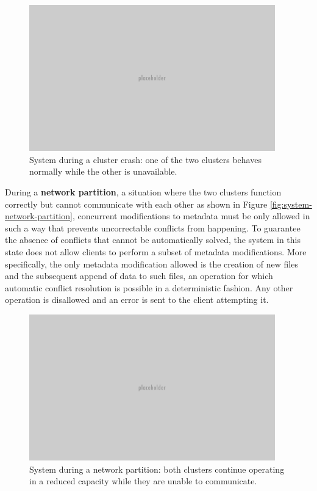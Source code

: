\begin{figure}[h]
\caption{System during a cluster crash: one of the two clusters behaves normally while the other is unavailable.}
\label{fig:system-cluster-crash}
\centering
\includegraphics[width=0.95\textwidth]{images/placeholder.png}
\end{figure}

During a \textbf{network partition}, a situation where the two clusters function correctly but cannot communicate with each other as shown in Figure \ref{fig:system-network-partition}, concurrent modifications to metadata must be only allowed in such a way that prevents uncorrectable conflicts from happening.
To guarantee the absence of conflicts that cannot be automatically solved, the system in this state does not allow clients to perform a subset of metadata modifications.
More specifically, the only metadata modification allowed is the creation of new files and the subsequent append of data to such files, an operation for which automatic conflict resolution is possible in a deterministic fashion.
Any other operation is disallowed and an error is sent to the client attempting it.

\begin{figure}[h]
\caption{System during a network partition: both clusters continue operating in a reduced capacity while they are unable to communicate.}
\label{fig:system-cluster-crash}
\centering
\includegraphics[width=0.95\textwidth]{images/placeholder.png}
\end{figure}

